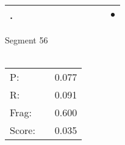 \documentclass[landscape]{article}
\newcommand{\ssp}{\hspace{2pt}}
\newcommand{\mex}{\cellcolor{g}$\bullet$}
\begin{document}
\begin{tabular}{|l|p{10pt}|p{10pt}|p{10pt}|p{10pt}|p{10pt}|p{10pt}|p{10pt}|p{10pt}|p{10pt}|p{10pt}|}
\hline
\ssp \cellcolor{ref9}. \ssp&\hspace{2pt}&\hspace{2pt}&\hspace{2pt}&\hspace{2pt}&\hspace{2pt}&\hspace{2pt}&\hspace{2pt}&\hspace{2pt}&\hspace{2pt}&\hspace{2pt}\mex\\
\hline
\end{tabular}

\vspace{6pt}
\noindent Segment 56\\\\
\noindent\begin{tabular}{lm{12pt}r}
\hline
P:&&0.077\\
R:&&0.091\\
Frag:&&0.600\\
Score:&&0.035\\
\end{tabular}

\newpage
\end{document}
